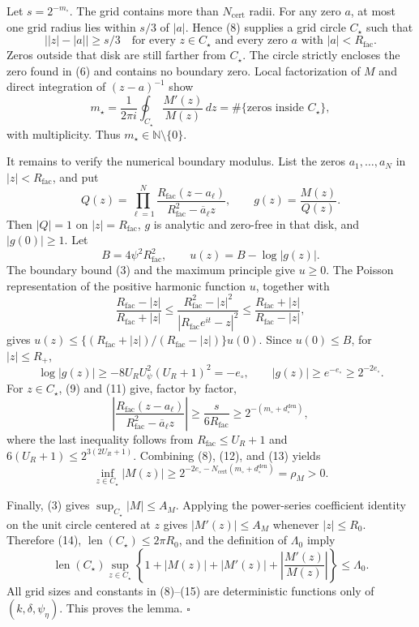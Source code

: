 Let \(s=2^{-m_\circ}\).  The grid contains more than \(N_{\mathrm{cert}}\) radii.  For any zero \(a\), at most one grid radius lies within \(s/3\) of \(|a|\).  Hence (8) supplies a grid circle \(C_\star\) such that
\[
 \bigl||z|-|a|\bigr|\ge s/3
 \quad\text{for every }z\in C_\star
 \text{ and every zero }a\text{ with }|a|<R_{\mathrm{fac}}. \tag{9}
\]
Zeros outside that disk are still farther from \(C_\star\).  The circle strictly encloses the zero found in (6) and contains no boundary zero.  Local factorization of \(M\) and direct integration of \((z-a)^{-1}\) show
\[
 m_\star=\frac1{2\pi i}\oint_{C_\star}\frac{M'(z)}{M(z)}\,dz
 =\#\{\text{zeros inside }C_\star\}, \tag{10}
\]
with multiplicity.  Thus \(m_\star\in\mathbb N\setminus\{0\}\).

It remains to verify the numerical boundary modulus.  List the zeros \(a_1,\ldots,a_N\) in \(|z|<R_{\mathrm{fac}}\), and put
\[
 Q(z)=\prod_{\ell=1}^N
 \frac{R_{\mathrm{fac}}(z-a_\ell)}{R_{\mathrm{fac}}^2-\overline a_\ell z},
 \qquad g(z)=\frac{M(z)}{Q(z)}. \tag{11}
\]
Then \(|Q|=1\) on \(|z|=R_{\mathrm{fac}}\), \(g\) is analytic and zero-free in that disk, and \(|g(0)|\ge1\).  Let
\[
 B=4\psi^2R_{\mathrm{fac}}^2,
 \qquad u(z)=B-\log|g(z)|.
\]
The boundary bound (3) and the maximum principle give \(u\ge0\).  The Poisson representation of the positive harmonic function \(u\), together with
\[
 \frac{R_{\mathrm{fac}}-|z|}{R_{\mathrm{fac}}+|z|}
 \le \frac{R_{\mathrm{fac}}^2-|z|^2}{|R_{\mathrm{fac}}e^{it}-z|^2}
 \le\frac{R_{\mathrm{fac}}+|z|}{R_{\mathrm{fac}}-|z|},
\]
gives \(u(z)\le\{(R_{\mathrm{fac}}+|z|)/(R_{\mathrm{fac}}-|z|)\}u(0)\).  Since \(u(0)\le B\), for \(|z|\le R_+\),
\[
 \log|g(z)|
 \ge-8U_RU_\psi^2(U_R+1)^2=-e_\circ,
 \qquad |g(z)|\ge e^{-e_\circ}\ge2^{-2e_\circ}. \tag{12}
\]
For \(z\in C_\star\), (9) and (11) give, factor by factor,
\[
 \left|\frac{R_{\mathrm{fac}}(z-a_\ell)}
 {R_{\mathrm{fac}}^2-\overline a_\ell z}\right|
 \ge\frac{s}{6R_{\mathrm{fac}}}
 \ge2^{-(m_\circ+d_\circ^{\mathrm{den}})}, \tag{13}
\]
where the last inequality follows from \(R_{\mathrm{fac}}\le U_R+1\) and \(6(U_R+1)\le2^{3(2U_R+1)}\).  Combining (8), (12), and (13) yields
\[
 \inf_{z\in C_\star}|M(z)|
 \ge2^{-2e_\circ-N_{\mathrm{cert}}(m_\circ+d_\circ^{\mathrm{den}})}
 =\rho_M>0. \tag{14}
\]

Finally, (3) gives \(\sup_{C_\star}|M|\le A_M\).  Applying the power-series coefficient identity on the unit circle centered at \(z\) gives \(|M'(z)|\le A_M\) whenever \(|z|\le R_0\).  Therefore (14), \(\operatorname{len}(C_\star)\le2\pi R_0\), and the definition of \(\Lambda_0\) imply
\[
 \operatorname{len}(C_\star)\sup_{z\in C_\star}
 \left\{1+|M(z)|+|M'(z)|+\left|\frac{M'(z)}{M(z)}\right|\right\}
 \le\Lambda_0. \tag{15}
\]
All grid sizes and constants in (8)--(15) are deterministic functions only of \((k,\delta,\psi_\eta)\).  This proves the lemma. \(\square\)